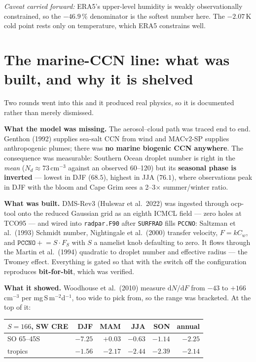 \documentclass[10pt]{article}
\begin{document}
\emph{Caveat carried forward:} ERA5's upper-level humidity is weakly observationally
constrained, so the $-46.9\,\%$ denominator is the softest number here. The $-2.07$\,K cold
point rests only on temperature, which ERA5 constrains well.

\section{The marine-CCN line: what was built, and why it is shelved}\label{sec:dms}

Two rounds went into this and it produced real physics, so it is documented rather than
merely dismissed.

\textbf{What the model was missing.} The aerosol--cloud path was traced end to end. Genthon
(1992) supplies sea-salt CCN from wind and MACv2-SP supplies anthropogenic plumes; there
was \textbf{no marine biogenic CCN anywhere}. The consequence was measurable: Southern
Ocean droplet number is right in the \emph{mean} ($N_d\approx73$\,cm$^{-3}$ against an
observed 60--120) but its \textbf{seasonal phase is inverted} --- lowest in DJF ($68.5$),
highest in JJA ($76.1$), where observations peak in DJF with the bloom and Cape Grim sees a
2--3$\times$ summer/winter ratio.

\textbf{What was built.} DMS-Rev3 (Hulswar et al.\ 2022) was ingested through ocp-tool onto
the reduced Gaussian grid as an eighth ICMCL field --- zero holes at TCO95 --- and wired
into \texttt{radpar.F90} after \texttt{SURFRAD} fills \texttt{PCCNO}: Saltzman et al.\
(1993) Schmidt number, Nightingale et al.\ (2000) transfer velocity, $F=kC_w$, and
$\mathtt{PCCNO}\mathrel{+}=S\cdot F_S$ with $S$ a namelist knob defaulting to zero. It
flows through the Martin et al.\ (1994) quadratic to droplet number and effective radius
--- the Twomey effect. Everything is gated so that with the switch off the configuration
reproduces \textbf{bit-for-bit}, which was verified.

\textbf{What it showed.} Woodhouse et al.\ (2010) measure $\mathrm{d}N/\mathrm{d}F$ from
$-43$ to $+166$\,cm$^{-3}$ per mg\,S\,m$^{-2}$d$^{-1}$, too wide to pick from, so the range
was bracketed. At the top of it:

\begin{center}\footnotesize
\begin{tabular}{l r r r r r}
\toprule
$S=166$, SW CRE & DJF & MAM & JJA & SON & annual \\
\midrule
SO 65--45S & $\mathbf{-7.25}$ & $+0.03$ & $-0.63$ & $-1.14$ & $-2.25$ \\
tropics & $-1.56$ & $-2.17$ & $-2.44$ & $-2.39$ & $-2.14$ \\
\bottomrule
\end{tabular}
\end{center}
\end{document}
